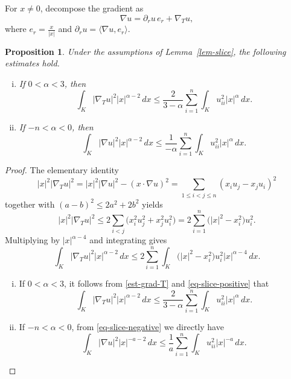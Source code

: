 \documentclass[12pt,leqno]{amsart}
\theoremstyle{plain} \newtheorem{thm}{Theorem}[section]
\theoremstyle{plain} \newtheorem{prop}[thm]{Proposition}
\theoremstyle{plain} \newtheorem{prob}[thm]{Problem}
\theoremstyle{definition} \newtheorem{defi}[thm]{Definition}
\theoremstyle{plain} \newtheorem{cor}[thm]{Corollary}
\theoremstyle{plain} \newtheorem{lem}[thm]{Lemma}
\theoremstyle{plain} \newtheorem{eg}{Example}[section]
\theoremstyle{remark} \newtheorem{rmk}[thm]{Remark}
\theoremstyle{plain} \newtheorem{conj}{Conjecture}
\numberwithin{equation}{section}
\newcommand{\dd}{\,d}
\begin{document}
For $x\neq0$, decompose the gradient as
\[\nabla u=\partial_r u\,e_r+\nabla_T u,\]
where $e_r=\frac{x}{|x|}$ and $\partial_r u=\langle\nabla u,e_r\rangle$.

\begin{prop}\label{prop-tangential}
  Under the assumptions of Lemma~\ref{lem-slice}, the following estimates hold.
  \begin{enumerate}[(i)]
  \item If $0<\alpha<3$, then
  \begin{equation}\label{eq-tangential-pos}
    \int_K|\nabla_T u|^2|x|^{\alpha-2}\dd x
    \le \frac{2}{3-\alpha} \sum_{i=1}^n\int_K u_{ii}^2|x|^\alpha\dd x.
  \end{equation}

  \item If $-n<\alpha<0$, then
  \begin{equation}\label{eq-nabla-neg}
    \int_K|\nabla u|^2|x|^{\alpha-2}\dd x
    \le \frac{1}{-\alpha} \sum_{i=1}^n\int_K u_{ii}^2|x|^\alpha\dd x.
  \end{equation}
   \end{enumerate}
\end{prop}

\begin{proof}
  The elementary identity
  \[
    |x|^2|\nabla_T u|^2
    =|x|^2|\nabla u|^2-(x\cdot\nabla u)^2
    =\sum_{1\le i<j\le n}(x_i u_j-x_j u_i)^2
  \]
  together with $(a-b)^2\le2a^2+2b^2$ yields
  \[
    |x|^2|\nabla_T u|^2
    \le2\sum_{i<j}\bigl(x_i^2u_j^2+x_j^2u_i^2\bigr)
    =2\sum_{i=1}^n\bigl(|x|^2-x_i^2\bigr)u_i^2.
  \]
  Multiplying by $|x|^{\alpha-4}$ and integrating gives
  \begin{equation}\label{est-grad-T}
       \int_K|\nabla_T u|^2|x|^{\alpha-2}\dd x
    \le2\sum_{i=1}^n
    \int_K\bigl(|x|^2-x_i^2\bigr)u_i^2|x|^{\alpha-4}\dd x.
  \end{equation}

  \begin{enumerate}[(i)]
  \item If $0<\alpha<3$, it follows from \eqref{est-grad-T} and \eqref{eq-slice-positive} that
  \[
    \int_K|\nabla_T u|^2|x|^{\alpha-2}\dd x
    \le\frac{2}{3-\alpha}\sum_{i=1}^n\int_K u_{ii}^2|x|^\alpha\dd x.
  \]

  \item If $-n<\alpha<0$, from \eqref{eq-slice-negative} we directly have
  \[
    \int_K|\nabla u|^2|x|^{-a-2}\dd x
    \le \frac{1}{a}\sum_{i=1}^n\int_K u_{ii}^2|x|^{-a}\dd x.
  \]
  \end{enumerate}
\end{proof}
\end{document}
